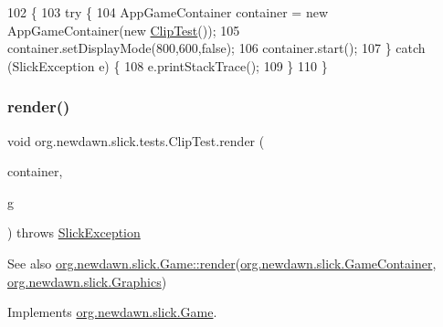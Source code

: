 \begin{DoxyCode}
102                                            \{
103         \textcolor{keywordflow}{try} \{
104             AppGameContainer container = \textcolor{keyword}{new} AppGameContainer(\textcolor{keyword}{new} \mbox{\hyperlink{classorg_1_1newdawn_1_1slick_1_1tests_1_1_clip_test_af40320ee7df72425ef9915b48055c543}{ClipTest}}());
105             container.setDisplayMode(800,600,\textcolor{keyword}{false});
106             container.start();
107         \} \textcolor{keywordflow}{catch} (SlickException e) \{
108             e.printStackTrace();
109         \}
110     \}
\end{DoxyCode}
\mbox{\label{classorg_1_1newdawn_1_1slick_1_1tests_1_1_clip_test_ac17812bc232e903eae8738751fbeba7d}} 
\subsubsection{\texorpdfstring{render()}{render()}}
{\footnotesize\ttfamily void org.\+newdawn.\+slick.\+tests.\+Clip\+Test.\+render (\begin{DoxyParamCaption}\item[{\mbox{\hyperlink{classorg_1_1newdawn_1_1slick_1_1_game_container}{Game\+Container}}}]{container,  }\item[{\mbox{\hyperlink{classorg_1_1newdawn_1_1slick_1_1_graphics}{Graphics}}}]{g }\end{DoxyParamCaption}) throws \mbox{\hyperlink{classorg_1_1newdawn_1_1slick_1_1_slick_exception}{Slick\+Exception}}\hspace{0.3cm}{\ttfamily [inline]}}

\begin{DoxySeeAlso}{See also}
\mbox{\hyperlink{interfaceorg_1_1newdawn_1_1slick_1_1_game_af1a4670d43eb3ba04dfcf55ab1975b64}{org.\+newdawn.\+slick.\+Game\+::render}}(\mbox{\hyperlink{classorg_1_1newdawn_1_1slick_1_1_game_container}{org.\+newdawn.\+slick.\+Game\+Container}}, \mbox{\hyperlink{classorg_1_1newdawn_1_1slick_1_1_graphics}{org.\+newdawn.\+slick.\+Graphics}}) 
\end{DoxySeeAlso}


Implements \mbox{\hyperlink{interfaceorg_1_1newdawn_1_1slick_1_1_game_af1a4670d43eb3ba04dfcf55ab1975b64}{org.\+newdawn.\+slick.\+Game}}.


